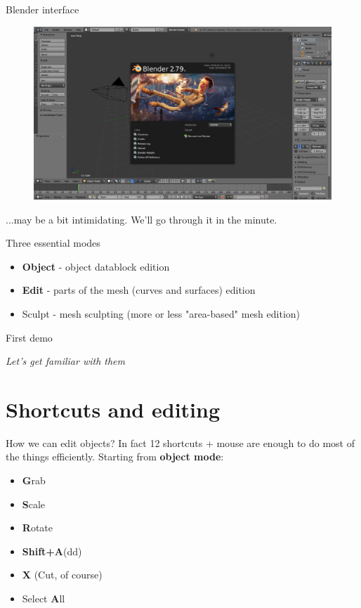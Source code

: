 \documentclass{beamer}
\begin{document}
\begin{frame}{Blender interface}

\begin{figure}
\includegraphics[scale=0.25]{interface.png}
\end{figure}

...may be a bit intimidating. We'll go through it in the minute.

\end{frame}

\begin{frame}{Three essential modes}

\begin{itemize}
\item \textbf{Object} - object datablock edition
\item \textbf{Edit} - parts of the mesh (curves and surfaces) edition
\item Sculpt - mesh sculpting (more or less "area-based" mesh edition)
\end{itemize}

\end{frame}

\begin{frame}{First demo}

\centering \Huge
\emph{Let's get familiar with them}

\end{frame}

\section{Shortcuts and editing}

\begin{frame}{How we can edit objects?}
In fact 12 shortcuts + mouse are enough
to do most of the things efficiently. Starting from \textbf{object mode}:
\begin{itemize}
\item \textbf{G}rab
\item \textbf{S}cale
\item \textbf{R}otate
\item \textbf{Shift+A}(dd)
\item \textbf{X} (Cut, of course)
\item Select \textbf{A}ll
\end{itemize}

\end{frame}
\end{document}
